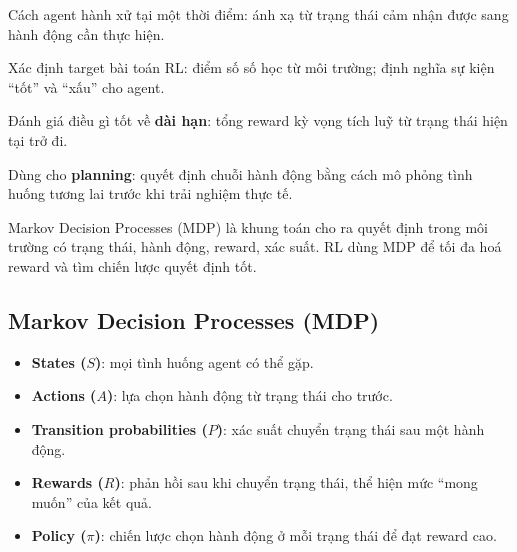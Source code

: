 \begin{dinhnghia}[title={Policy (chính sách)}]
Cách agent hành xử tại một thời điểm: ánh xạ từ trạng thái cảm nhận được sang hành động cần thực hiện.
\end{dinhnghia}

\begin{dinhnghia}[title={Reward signal}]
Xác định target bài toán RL: điểm số số học từ môi trường; định nghĩa sự kiện ``tốt'' và ``xấu'' cho agent.
\end{dinhnghia}

\begin{dinhnghia}[title={Value function}]
Đánh giá điều gì tốt về \textbf{dài hạn}: tổng reward kỳ vọng tích luỹ từ trạng thái hiện tại trở đi.
\end{dinhnghia}

\begin{dinhnghia}[title={Model}]
Dùng cho \textbf{planning}: quyết định chuỗi hành động bằng cách mô phỏng tình huống tương lai trước khi trải nghiệm thực tế.
\end{dinhnghia}

\begin{ynghia}[title={MDP}]
Markov Decision Processes (MDP) là khung toán cho ra quyết định trong môi trường có trạng thái, hành động, reward, xác suất.
RL dùng MDP để tối đa hoá reward và tìm chiến lược quyết định tốt.
\end{ynghia}

\subsection{Markov Decision Processes (MDP)}

\begin{phuongphap}[title={Thành phần MDP}]
\begin{itemize}
  \item \textbf{States ($S$)}: mọi tình huống agent có thể gặp.
  \item \textbf{Actions ($A$)}: lựa chọn hành động từ trạng thái cho trước.
  \item \textbf{Transition probabilities ($P$)}: xác suất chuyển trạng thái sau một hành động.
  \item \textbf{Rewards ($R$)}: phản hồi sau khi chuyển trạng thái, thể hiện mức ``mong muốn'' của kết quả.
  \item \textbf{Policy ($\pi$)}: chiến lược chọn hành động ở mỗi trạng thái để đạt reward cao.
\end{itemize}
\end{phuongphap}

